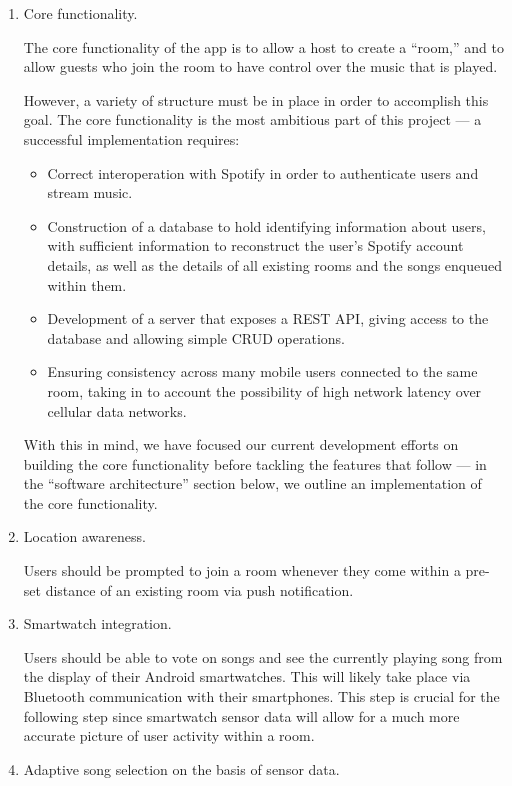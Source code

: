\documentclass[12pt]{article}
\begin{document}
\begin{enumerate}
\item Core functionality.

The core functionality of the app is to allow a host to create a ``room,''
and to allow guests who join the room to have control over the music
that is played.

However, a variety of structure must be in place in order to
accomplish this goal. The core functionality is the most ambitious
part of this project --- a successful implementation requires:
\begin{itemize}
\item Correct interoperation with Spotify in order to authenticate
  users and stream music.
\item Construction of a database to hold identifying information about
  users, with sufficient information to reconstruct the user's Spotify
  account details, as well as the details of all existing rooms and
  the songs enqueued within them.
\item Development of a server that exposes a REST API, giving access
  to the database and allowing simple CRUD operations.
\item Ensuring consistency across many mobile users connected to the
  same room, taking in to account the possibility of high network
  latency over cellular data networks.
\end{itemize}

With this in mind, we have focused our current development efforts on
building the core functionality before tackling the features that
follow --- in the ``software architecture'' section below, we outline
an implementation of the core functionality.

\item Location awareness.

Users should be prompted to join a room whenever they come within a
pre-set distance of an existing room via push notification.

\item Smartwatch integration.

  Users should be able to vote on songs and see the currently playing
  song from the display of their Android smartwatches. This will
  likely take place via Bluetooth communication with their
  smartphones. This step is crucial for the following step since
  smartwatch sensor data will allow for a much more accurate picture
  of user activity within a room.

\item Adaptive song selection on the basis of sensor data.


\end{enumerate}
\end{document}
